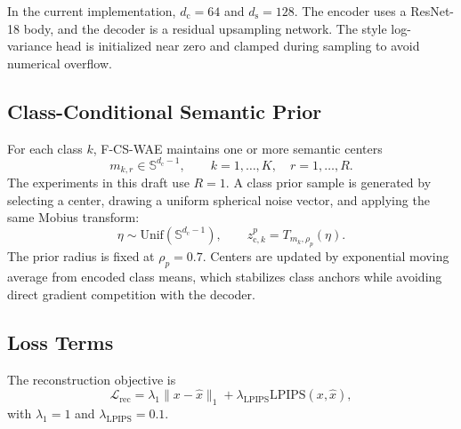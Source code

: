 \documentclass[10pt]{article}
\newcommand{\ours}{F-CS-WAE}
\newcommand{\Sph}{\mathbb{S}}
\begin{document}
In the current implementation, $d_{\mathrm{c}}=64$ and $d_{\mathrm{s}}=128$. The encoder uses a ResNet-18 body, and the decoder is a residual upsampling network. The style log-variance head is initialized near zero and clamped during sampling to avoid numerical overflow.

\subsection{Class-Conditional Semantic Prior}

For each class $k$, \ours{} maintains one or more semantic centers
\begin{equation}
    m_{k,r}\in\Sph^{d_{\mathrm{c}}-1},
    \qquad k=1,\dots,K,\quad r=1,\dots,R.
\end{equation}
The experiments in this draft use $R=1$. A class prior sample is generated by selecting a center, drawing a uniform spherical noise vector, and applying the same Mobius transform:
\begin{equation}
    \eta\sim\mathrm{Unif}(\Sph^{d_{\mathrm{c}}-1}),
    \qquad
    z_{\mathrm{c},k}^{p}=T_{m_k,\rho_p}(\eta).
\end{equation}
The prior radius is fixed at $\rho_p=0.7$. Centers are updated by exponential moving average from encoded class means, which stabilizes class anchors while avoiding direct gradient competition with the decoder.

\subsection{Loss Terms}

The reconstruction objective is
\begin{equation}
    \mathcal{L}_{\mathrm{rec}} =
    \lambda_1\|x-\hat{x}\|_1
    + \lambda_{\mathrm{LPIPS}}\mathrm{LPIPS}(x,\hat{x}),
\end{equation}
with $\lambda_1=1$ and $\lambda_{\mathrm{LPIPS}}=0.1$.
\end{document}
